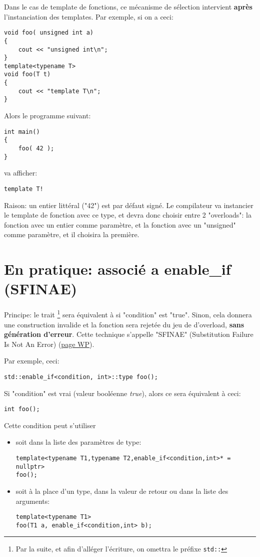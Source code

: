 \documentclass[11pt,a4paper]{article}
\begin{document}
Dans le cas de template de fonctions, ce mécanisme de sélection intervient {\bf après} l'instanciation des templates.
Par exemple, si on a ceci:
\begin{lstlisting}
void foo( unsigned int a)
{
	cout << "unsigned int\n";
}
template<typename T>
void foo(T t)
{
	cout << "template T\n";
}
\end{lstlisting}

Alors le programme suivant:
\begin{lstlisting}
int main()
{
	foo( 42 );
}
\end{lstlisting}

va afficher:
\begin{lstlisting}
template T!
\end{lstlisting}

Raison: un entier littéral ("42") est par défaut signé.
Le compilateur va instancier le template de fonction avec ce type, et devra donc choisir entre 2 "overloads":
la fonction avec un entier comme paramètre, et la fonction avec un "unsigned" comme paramètre, et il choisira la première.


\section{En pratique: associé a enable\_if (SFINAE)}

Principe:
le trait %
\footnote{Par la suite, et afin d'alléger l'écriture, on omettra le préfixe {\tt std::}}
sera équivalent à  si "condition" est "true".
Sinon, cela donnera une construction invalide et la fonction sera rejetée du jeu de d'overload, {\bf sans génération d'erreur}.
Cette technique s'appelle "SFINAE" (Substitution Failure Is Not An Error)
(\href{https://en.wikipedia.org/wiki/Substitution_failure_is_not_an_error}{page WP}).

Par exemple, ceci:
\begin{lstlisting}
std::enable_if<condition, int>::type foo();
\end{lstlisting}
Si "condition" est vrai (valeur booléenne {\em true}), alors ce sera équivalent à ceci:
\begin{lstlisting}
int foo();
\end{lstlisting}

Cette condition peut s'utiliser
\begin{itemize}
	\item soit dans la liste des paramètres de type:
\begin{lstlisting}
template<typename T1,typename T2,enable_if<condition,int>* = nullptr>
foo();
\end{lstlisting}

	\item soit à la place d'un type, dans la valeur de retour ou dans la liste des arguments:
\begin{lstlisting}
template<typename T1>
foo(T1 a, enable_if<condition,int> b);
\end{lstlisting}
	
\end{itemize}
\end{document}
